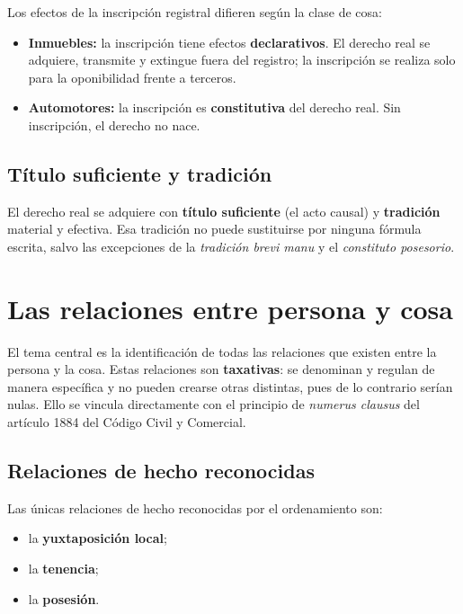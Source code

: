 \documentclass[12pt,oneside]{book}
\begin{document}
Los efectos de la inscripción registral difieren según la clase de cosa:

\begin{itemize}
    \item \textbf{Inmuebles:} la inscripción tiene efectos \textbf{declarativos}. El derecho real se adquiere, transmite y extingue fuera del registro; la inscripción se realiza solo para la oponibilidad frente a terceros.
    \item \textbf{Automotores:} la inscripción es \textbf{constitutiva} del derecho real. Sin inscripción, el derecho no nace.
\end{itemize}

\subsection{Título suficiente y tradición}

El derecho real se adquiere con \textbf{título suficiente} (el acto causal) y \textbf{tradición} material y efectiva. Esa tradición no puede sustituirse por ninguna fórmula escrita, salvo las excepciones de la \textit{tradición brevi manu} y el \textit{constituto posesorio}.

\section{Las relaciones entre persona y cosa}

El tema central es la identificación de todas las relaciones que existen entre la persona y la cosa. Estas relaciones son \textbf{taxativas}: se denominan y regulan de manera específica y no pueden crearse otras distintas, pues de lo contrario serían nulas. Ello se vincula directamente con el principio de \textit{numerus clausus} del artículo 1884 del Código Civil y Comercial.

\subsection{Relaciones de hecho reconocidas}

Las únicas relaciones de hecho reconocidas por el ordenamiento son:

\begin{itemize}
    \item la \textbf{yuxtaposición local};
    \item la \textbf{tenencia};
    \item la \textbf{posesión}.
\end{itemize}
\end{document}
